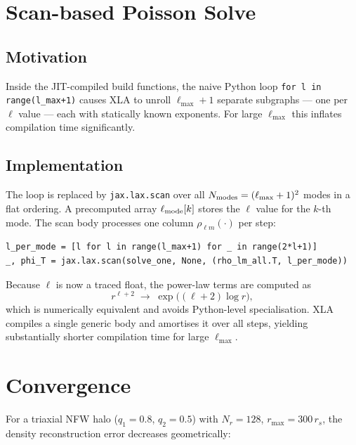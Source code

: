 \documentclass[11pt]{article}
\begin{document}
\section{Scan-based Poisson Solve}

\subsection{Motivation}

Inside the JIT-compiled build functions, the naive Python loop
\texttt{for l in range(l\_max+1)} causes XLA to unroll $\ell_{\max}+1$
separate subgraphs — one per $\ell$ value — each with statically known
exponents.  For large $\ell_{\max}$ this inflates compilation time
significantly.

\subsection{Implementation}

The loop is replaced by \texttt{jax.lax.scan} over all $N_{\rm modes} =
(\ell_{\max}+1)^2$ modes in a flat ordering.  A precomputed array
$\ell_{\rm mode}[k]$ stores the $\ell$ value for the $k$-th mode.  The scan
body processes one column $\rho_{\ell m}(\cdot)$ per step:
\begin{lstlisting}
l_per_mode = [l for l in range(l_max+1) for _ in range(2*l+1)]
_, phi_T = jax.lax.scan(solve_one, None, (rho_lm_all.T, l_per_mode))
\end{lstlisting}
Because $\ell$ is now a traced float, the power-law terms are computed as
\begin{equation}
  r^{\ell+2} \;\longrightarrow\; \exp\!\bigl((\ell+2)\log r\bigr),
\end{equation}
which is numerically equivalent and avoids Python-level specialisation.  XLA
compiles a single generic body and amortises it over all steps, yielding
substantially shorter compilation time for large $\ell_{\max}$.

\section{Convergence}

For a triaxial NFW halo ($q_1=0.8$, $q_2=0.5$) with $N_r=128$,
$r_{\max}=300\,r_s$, the density reconstruction error decreases geometrically:
\end{document}
